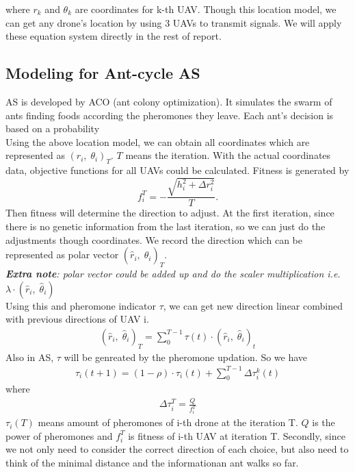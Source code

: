 \documentclass[lang=cn,a4paper,newtx]{elegantpaper}
\begin{document}
where $r_k$ and $\theta_k$ are coordinates for k-th UAV. 
Though this location model, we can get any drone's location by using 3 UAVs to transmit signals.
We will apply these equation system directly in the rest of report.

\subsection{Modeling for Ant-cycle AS}
AS is developed by ACO (ant colony optimization).
It simulates the swarm of ants finding foods according the pheromones they leave.
Each ant's decision is based on a probability\\
Using the above location model, we can obtain all coordinates which are represented as $(r_i,\; \theta_i)_T$.
$T$ means the iteration.
With the actual coordinates data, objective functions for all UAVs could be calculated.
Fitness is generated by 
\[
  f_i^T =-\frac{\sqrt{ h_i^2 + \Delta r_i^2}}{T}.
\]
\newpage
Then fitness will determine the direction to adjust.
At the first iteration, since there is no genetic information from the last iteration, so we can just do the adjustments though coordinates.
We record the direction which can be represented as polar vector $(\hat{r}_i,\; \hat{\theta}_i)_T$.\\
\textit{\textbf{Extra note}: polar vector could be added up and do the scaler multiplication i.e. $\lambda \cdot (\hat{r}_i,\; \hat{\theta}_i)$\\}
Using this and pheromone indicator $\tau$, we can get new direction linear combined with previous directions of UAV i.
\begin{align*}
  (\hat{r}_i,\; \hat{\theta}_i)_T = \sum_0^{T-1} \tau(t)\cdot (\hat{r}_i,\; \hat{\theta}_i)_t
\end{align*}
Also in AS, $\tau$ will be genreated by the pheromone updation.
So we have 
\begin{align*}
  \tau_i(t+1) = (1-\rho)\cdot \tau_i(t) +\sum_{0}^{T-1}\Delta \tau_i^k(t)
\end{align*}
where
\begin{align*}
  \Delta \tau_i^T = \frac{Q}{f_i^T}
\end{align*}
$\tau_i(T)$ means amount of pheromones of i-th drone at the iteration T.
$Q$ is the power of pheromones and $f_i^T$ is fitness of i-th UAV at iteration T.
Secondly, since we not only need to consider the correct direction of each choice, 
but also need to think of the minimal distance and the informationan ant walks so far.
\end{document}
